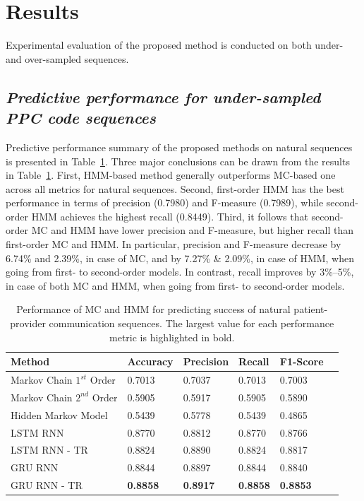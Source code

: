 \documentclass{amia_summit_2018}
\begin{document}
\section*{Results}
Experimental evaluation of the proposed method is conducted on both under- and over-sampled sequences. 

\subsection*{\textit{Predictive performance for under-sampled PPC code sequences}}
Predictive performance summary of the proposed methods on natural sequences is presented in Table~\ref{tab:result_under_sampled}. Three major conclusions can be drawn from the results in Table~\ref{tab:result_under_sampled}. First, HMM-based method generally outperforms MC-based one across all metrics for natural sequences. Second, first-order HMM has the best performance in terms of precision (0.7980) and F-measure (0.7989), while second-order HMM achieves the highest recall (0.8449). Third,  it follows that second-order MC and HMM have lower precision and F-measure, but higher recall than first-order MC and HMM. In particular, precision and F-measure decrease by 6.74\% and 2.39\%, in case of MC, and by 7.27\% \& 2.09\%, in case of HMM, when going from first- to second-order models. In contrast, recall improves by 3\%--5\%, in case of both MC and HMM, when going from first- to second-order models. \\

\begin{table}[h]
\centering
\caption{Performance of MC and HMM for predicting success of natural patient-provider communication sequences. The largest value for each performance metric is highlighted in bold.}
\label{tab:result_under_sampled}
  \begin{tabular}{|l|l|l|l|l|l|}
  \hline
   \textbf{Method} & \textbf{Accuracy}  & \textbf{Precision}  & \textbf{Recall} & \textbf{F1-Score}\\ \hline    
    
 Markov Chain $1^{st}$ Order & 0.7013 & 0.7037 & 0.7013 & 0.7003\\ \hline
 Markov Chain $2^{nd}$ Order & 0.5905 & 0.5917 & 0.5905 & 0.5890\\ \hline
 Hidden Markov Model & 0.5439 & 0.5778 & 0.5439 & 0.4865\\ \hline
 LSTM RNN & 0.8770 & 0.8812 & 0.8770 & 0.8766\\ \hline
 LSTM RNN - TR & 0.8824 & 0.8890 & 0.8824 & 0.8817\\ \hline
 GRU RNN & 0.8844 & 0.8897 & 0.8844 & 0.8840\\ \hline
 GRU RNN - TR & \textbf{0.8858} & \textbf{0.8917} & \textbf{0.8858} & \textbf{0.8853}\\ \hline 
  \end{tabular}
\end{table} 
\end{document}
